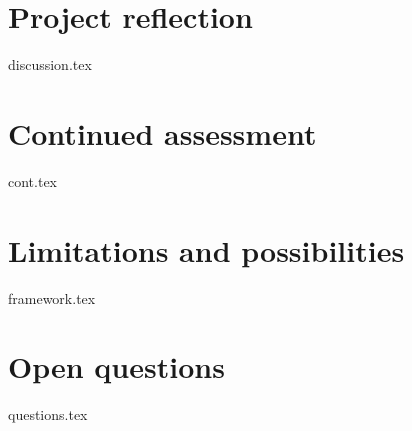 
















\section{Project reflection}\label{sec:whatif:discussion}
    {{discussion.tex}}


\section{Continued assessment}\label{sec:whatif:cont}
    {{cont.tex}}


\section{Limitations and possibilities}\label{sec:whatif:framework}
    {{framework.tex}}


\section{Open questions}\label{sec:whatif:questions}
    {{questions.tex}}





    
